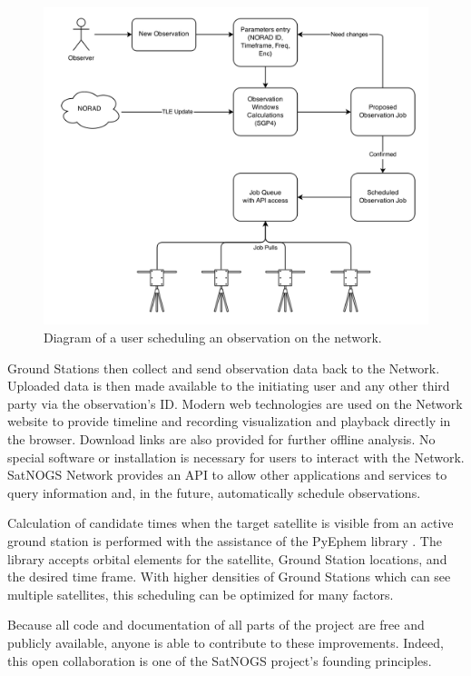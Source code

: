 \documentclass[conference,12pt]{IEEEtran}
\newlength{\figwidth}
\begin{document}
\begin{figure}[htbp]
\centering
\includegraphics[width=\figwidth]{fig/network-flow}
\caption{Diagram of a user scheduling an observation on the network.}
\label{f:network}
\end{figure}

Ground Stations then collect and send observation data back to the Network.
Uploaded data is then made available to the initiating user and any other third party via the observation's ID.
Modern web technologies are used on the Network website to provide timeline and recording visualization and playback directly in the browser.
Download links are also provided for further offline analysis.
No special software or installation is necessary for users to interact with the Network.
SatNOGS Network provides an API to allow other applications and services to query information and, in the future, automatically schedule observations.

Calculation of candidate times when the target satellite is visible from an active ground station is performed with the assistance of the PyEphem library \cite{PyEphem}.
The library accepts orbital elements for the satellite, Ground Station locations, and the desired time frame.
With higher densities of Ground Stations which can see multiple satellites, this scheduling can be optimized for many factors.

Because all code and documentation of all parts of the project are free and publicly available, anyone is able to contribute to these improvements.
Indeed, this open collaboration is one of the SatNOGS project's founding principles.
\end{document}
